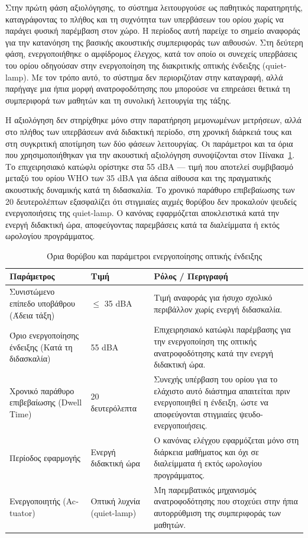 Στην πρώτη φάση αξιολόγησης, το σύστημα λειτουργούσε ως παθητικός παρατηρητής, καταγράφοντας το πλήθος και τη συχνότητα των υπερβάσεων του ορίου χωρίς να παράγει φυσική παρέμβαση στον χώρο. Η περίοδος αυτή παρείχε το σημείο αναφοράς για την κατανόηση της βασικής ακουστικής συμπεριφοράς των αιθουσών. Στη δεύτερη φάση, ενεργοποιήθηκε ο αμφίδρομος έλεγχος, κατά τον οποίο οι συνεχείς υπερβάσεις του ορίου οδηγούσαν στην ενεργοποίηση της διακριτικής οπτικής ένδειξης (\textlatin{quiet-lamp}). Με τον τρόπο αυτό, το σύστημα δεν περιοριζόταν στην καταγραφή, αλλά παρήγαγε μια ήπια μορφή ανατροφοδότησης που μπορούσε να επηρεάσει θετικά τη συμπεριφορά των μαθητών και τη συνολική λειτουργία της τάξης.

Η αξιολόγηση δεν στηρίχθηκε μόνο στην παρατήρηση μεμονωμένων μετρήσεων, αλλά στο πλήθος των υπερβάσεων ανά διδακτική περίοδο, στη χρονική διάρκειά τους και στη συγκριτική αποτίμηση των δύο φάσεων λειτουργίας. Οι παράμετροι και τα όρια που χρησιμοποιήθηκαν για την ακουστική αξιολόγηση συνοψίζονται στον Πίνακα~\ref{tab:noise_limits}. Το επιχειρησιακό κατώφλι ορίστηκε στα 55 \textlatin{dBA} --- τιμή που αποτελεί συμβιβασμό μεταξύ του ορίου \textlatin{WHO} των 35 \textlatin{dBA} για άδεια αίθουσα και της πραγματικής ακουστικής δυναμικής κατά τη διδασκαλία. Το χρονικό παράθυρο επιβεβαίωσης των 20 δευτερολέπτων εξασφαλίζει ότι στιγμιαίες αιχμές θορύβου δεν προκαλούν ψευδείς ενεργοποιήσεις της \textlatin{quiet-lamp}. Ο κανόνας εφαρμόζεται αποκλειστικά κατά την ενεργή διδακτική ώρα, αποφεύγοντας παρεμβάσεις κατά τα διαλείμματα ή εκτός ωρολογίου προγράμματος.

\begin{table}[htbp]
\centering
\caption{Όρια θορύβου και παράμετροι ενεργοποίησης οπτικής ένδειξης}
\label{tab:noise_limits}
\begin{tabular}{|p{4.8cm}|p{3cm}|p{6.2cm}|}
\hline
\textbf{Παράμετρος} & \textbf{Τιμή} & \textbf{Ρόλος / Περιγραφή} \\
\hline
Συνιστώμενο επίπεδο υποβάθρου (Άδεια τάξη) & $\leq$ 35 \textlatin{dBA} & Τιμή αναφοράς για ήσυχο σχολικό περιβάλλον χωρίς ενεργή διδασκαλία. \\
\hline
Όριο ενεργοποίησης ένδειξης (Κατά τη διδασκαλία) & 55 \textlatin{dBA} & Επιχειρησιακό κατώφλι παρέμβασης για την ενεργοποίηση της οπτικής ανατροφοδότησης κατά την ενεργή διδακτική ώρα. \\
\hline
Χρονικό παράθυρο επιβεβαίωσης (\textlatin{Dwell Time}) & 20 δευτερόλεπτα & Συνεχής υπέρβαση του ορίου για το ελάχιστο αυτό διάστημα απαιτείται πριν ενεργοποιηθεί η ένδειξη, ώστε να αποφεύγονται στιγμιαίες ψευδο-ενεργοποιήσεις. \\
\hline
Περίοδος εφαρμογής & Ενεργή διδακτική ώρα & Ο κανόνας ελέγχου εφαρμόζεται μόνο στη διάρκεια μαθήματος και όχι σε διαλείμματα ή εκτός ωρολογίου προγράμματος. \\
\hline
Ενεργοποιητής (\textlatin{Actuator}) & Οπτική λυχνία (\textlatin{quiet-lamp}) & Μη παρεμβατικός μηχανισμός ανατροφοδότησης που στοχεύει στην ήπια αυτορρύθμιση της συμπεριφοράς των μαθητών. \\
\hline
\end{tabular}
\end{table}

